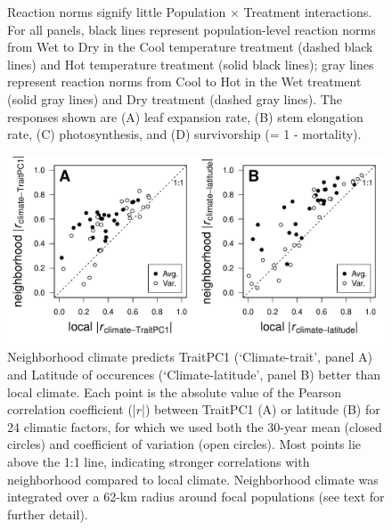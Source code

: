 \documentclass[11pt, oneside]{article}
\begin{document}
\begin{figure}
\begin{subfigure}{0.4\textwidth}
        \label{fig:FigS_MortRxnNorm}
    \end{subfigure}
\caption[Reaction norms]{Reaction norms signify little Population $\times$ Treatment interactions. For all panels, black lines represent population-level reaction norms from Wet to Dry in the Cool temperature treatment (dashed black lines) and Hot temperature treatment (solid black lines); gray lines represent reaction norms from Cool to Hot in the Wet treatment (solid gray lines) and Dry treatment (dashed gray lines). The responses shown are (A) leaf expansion rate, (B) stem elongation rate, (C) photosynthesis, and (D) survivorship (= 1 - mortality).}
	\label{fig:FigS_RxnNorms}
\end{figure}


\begin{figure}[h!]
\centerline{\includegraphics[width=1\textwidth]{Figures/FigureS_LocalvNeighCorr.pdf}}
\fontsize{10}{12}
\selectfont
\caption[Local versus neighborhood correlations]{Neighborhood climate predicts TraitPC1 (`Climate-trait', panel A) and Latitude of occurences (`Climate-latitude', panel B) better than local climate. Each point is the absolute value of the Pearson correlation coefficient (|$r$|) between TraitPC1 (A) or latitude (B) for 24 climatic factors, for which we used both the 30-year mean (closed circles) and coefficient of variation (open circles). Most points lie above the 1:1 line, indicating stronger correlations with neighborhood compared to local climate. Neighborhood climate was integrated over a 62-km radius around focal populations (see text for further detail).}
\label{fig:FigS_LocalvNeighCorr}
\end{figure}

\end{document}
